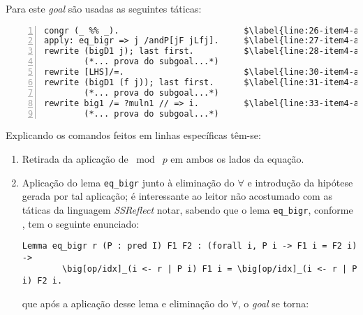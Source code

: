 \begin{enumerate}[label=\textbf{\roman*.}]
\begin{enumerate}[label=\textbf{\roman{enumi}.(\alph*)}]
                Para este \textit{goal} são usadas as seguintes táticas:
                
                        \begin{lstlisting}[language=coq,frame=single, numbers=left,stepnumber=1,tabsize=1, escapechar=\$, name=proof]
congr (_ %% _).                         $\label{line:26-item4-a}$
apply: eq_bigr => j /andP[jF jLfj].     $\label{line:27-item4-a}$
rewrite (bigD1 j); last first.          $\label{line:28-item4-a}$
        (*... prova do subgoal...*)
rewrite [LHS]/=.                        $\label{line:30-item4-a}$
rewrite (bigD1 (f j)); last first.      $\label{line:31-item4-a}$
        (*... prova do subgoal...*)
rewrite big1 /= ?muln1 // => i.         $\label{line:33-item4-a}$
        (*... prova do subgoal...*)
                        \end{lstlisting}
                
                Explicando os comandos feitos em linhas específicas têm-se:
        
                \begin{enumerate}[listparindent=\parindent]
                
                        \item[\textbf{(\ref{line:26-item4-a})}] Retirada da aplicação de $\bmod \; p$ em ambos os lados da equação.
                
                        \item[\textbf{(\ref{line:27-item4-a})}] Aplicação do lema \lstinline[language=coq]|eq_bigr| junto à eliminação do $\forall$ e introdução da hipótese gerada por tal aplicação; é interessante ao leitor não acostumado com as táticas da linguagem \textit{SSReflect} notar, sabendo que o lema \lstinline[language=coq]|eq_bigr|, conforme \cite{mathcomp-bigop}, tem o seguinte enunciado:
        
                                \begin{lstlisting}[language=coq,frame=single,tabsize=1]
Lemma eq_bigr r (P : pred I) F1 F2 : (forall i, P i -> F1 i = F2 i) ->
        \big[op/idx]_(i <- r | P i) F1 i = \big[op/idx]_(i <- r | P i) F2 i.
                                \end{lstlisting}
                        que após a aplicação desse lema e eliminação do $\forall$, o \textit{goal} se torna:
                        

\end{enumerate}
\end{enumerate}
\end{enumerate}
